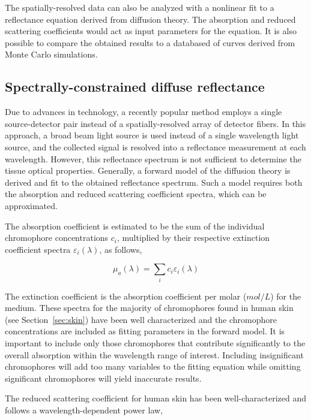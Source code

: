 The spatially-resolved data can also be analyzed with a nonlinear fit to a reflectance equation derived from diffusion theory. The absorption and reduced scattering coefficients would act as input parameters for the equation. It is also possible to compare the obtained results to a databased of curves derived from Monte Carlo simulations.

\subsection{Spectrally-constrained diffuse reflectance}
\label{spec_diff_refl}
Due to advances in technology, a recently popular method employs a single source-detector pair instead of a spatially-resolved array of detector fibers. In this approach, a broad beam light source is used instead of a single wavelength light source, and the collected signal is resolved into a reflectance measurement at each wavelength. However, this reflectance spectrum is not sufficient to determine the tissue optical properties. Generally, a forward model of the diffusion theory is derived and fit to the obtained reflectance spectrum. Such a model requires both the absorption and reduced scattering coefficient spectra, which can be approximated.

The absorption coefficient is estimated to be the sum of the individual chromophore concentrations $c_i$, multiplied by their respective extinction coefficient spectra $\varepsilon_i(\lambda)$, as follows,

\begin{equation}
\mu_a(\lambda) = \sum_i c_i \varepsilon_i(\lambda)
\end{equation}

The extinction coefficient is the absorption coefficient per molar ($mol/L$) for the medium. These spectra for the majority of chromophores found in human skin (see Section~\ref{sec:skin}) have been well characterized and the chromophore concentrations are included as fitting parameters in the forward model. It is important to include only those chromophores that contribute significantly to the overall absorption within the wavelength range of interest. Including insignificant chromophores will add too many variables to the fitting equation while omitting significant chromophores will yield inaccurate results.

The reduced scattering coefficient for human skin has been well-characterized and follows a wavelength-dependent power law,\cite{Doornbos1999}

